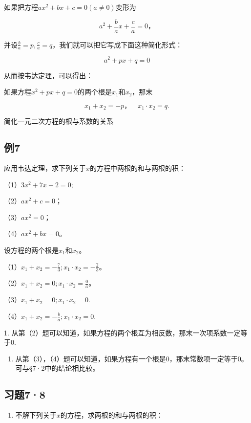 如果把方程\(ax^2 + bx + c = 0 (a \neq 0)\)变形为

\[
a ^ {2} + \frac{b}{a} x + \frac{c}{a} = 0\text{，}
\]

并设\(\frac{b}{a} = p, \frac{c}{a} = q\)，我们就可以把它写成下面这种简化形式：

\[
a ^ {2} + p x + q = 0
\]

从而按韦达定理，可以得出：

如果方程\(x^{2} + px + q = 0\)的两个根是\(x_{1}\)和\(x_{2}\)，那末

\[
x _ {1} + x _ {2} = - p\text{，} \quad x _ {1} \cdot x _ {2} = q.
\]

简化一元二次方程的根与系数的关系

\subsection{例7}

应用韦达定理，求下列关于\(x\)的方程中两根的和与两根的积：

（1）\(3x^{2} + 7x - 2 = 0;\)

（2）\(ax^2 + c = 0\)；

（3）\(ax^2 = 0\)；

（4）\(ax^2 + bx = 0\)。

 设方程的两个根是\(x_{1}\)和\(x_{2}\)。

（1）\(x_{1} + x_{2} = -\frac{7}{3}; x_{1} \cdot x_{2} = -\frac{2}{3}\)。

（2）\(x_{1} + x_{2} = 0; x_{1} \cdot x_{2} = \frac{0}{a}\)。

（3）\(x_{1} + x_{2} = 0; x_{1} \cdot x_{2} = 0.\)

（4）\(x_{1} + x_{2} = -\frac{b}{a}; x_{1} \cdot x_{2} = 0.\)

 1.
从第（2）题可以知道，如果方程的两个根互为相反数，那末一次项系数一定等于0.

\begin{enumerate}[start=2]
\item
  从第（3），（4）题可以知道，如果方程有一个根是0，那末常数项一定等于0。可与§7·2中的结论相比较。
\end{enumerate}

\subsection{习题7·8}

\begin{enumerate}
\item
  不解下列关于\(x\)的方程，求两根的和与两根的积：
\end{enumerate}

